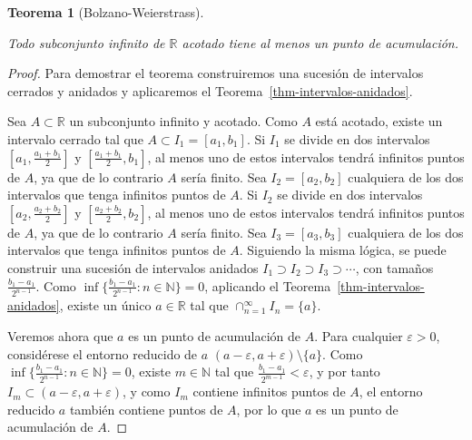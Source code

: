\documentclass[
  a4paper,
]{scrreport}
\theoremstyle{definition}
\theoremstyle{plain}
\theoremstyle{definition}
\theoremstyle{definition}
\theoremstyle{plain}
\newtheorem{theorem}{Teorema}[chapter]
\theoremstyle{plain}
\theoremstyle{remark}
\begin{document}
\begin{theorem}[Bolzano-Weierstrass]\protect\hypertarget{thm-bolzano-weierstrass}{}\label{thm-bolzano-weierstrass}

Todo subconjunto infinito de \(\mathbb{R}\) acotado tiene al menos un
punto de acumulación.

\end{theorem}

\begin{tcolorbox}[enhanced jigsaw, leftrule=.75mm, colbacktitle=quarto-callout-note-color!10!white, toprule=.15mm, opacityback=0, opacitybacktitle=0.6, toptitle=1mm, breakable, bottomtitle=1mm, colframe=quarto-callout-note-color-frame, rightrule=.15mm, titlerule=0mm, title=\textcolor{quarto-callout-note-color}{\faInfo}\hspace{0.5em}{Demostración}, arc=.35mm, left=2mm, bottomrule=.15mm, colback=white, coltitle=black]

\begin{proof}
Para demostrar el teorema construiremos una sucesión de intervalos
cerrados y anidados y aplicaremos el
Teorema~\ref{thm-intervalos-anidados}.

Sea \(A\subset \mathbb{R}\) un subconjunto infinito y acotado. Como
\(A\) está acotado, existe un intervalo cerrado tal que
\(A\subset I_1=[a_1,b_1]\). Si \(I_1\) se divide en dos intervalos
\([a_1, \frac{a_1+b_1}{2}]\) y \([\frac{a_1+b_1}{2}, b_1]\), al menos
uno de estos intervalos tendrá infinitos puntos de \(A\), ya que de lo
contrario \(A\) sería finito. Sea \(I_2=[a_2,b_2]\) cualquiera de los
dos intervalos que tenga infinitos puntos de \(A\). Si \(I_2\) se divide
en dos intervalos \([a_2, \frac{a_2+b_2}{2}]\) y
\([\frac{a_2+b_2}{2}, b_2]\), al menos uno de estos intervalos tendrá
infinitos puntos de \(A\), ya que de lo contrario \(A\) sería finito.
Sea \(I_3=[a_3,b_3]\) cualquiera de los dos intervalos que tenga
infinitos puntos de \(A\). Siguiendo la misma lógica, se puede construir
una sucesión de intervalos anidados
\(I_1\supset I_2\supset I_3 \supset \cdots\), con tamaños
\(\frac{b_1-a_1}{2^{n-1}}\). Como
\(\inf\{\frac{b_1-a_1}{2^{n-1}}: n\in\mathbb{N}\} =0\), aplicando el
Teorema~\ref{thm-intervalos-anidados}, existe un único
\(a\in\mathbb{R}\) tal que \(\cap_{n=1}^\infty I_n=\{a\}\).

Veremos ahora que \(a\) es un punto de acumulación de \(A\). Para
cualquier \(\varepsilon>0\), considérese el entorno reducido de \(a\)
\((a-\varepsilon, a+\varepsilon)\setminus\{a\}\). Como
\(\inf\{\frac{b_1-a_1}{2^{n-1}}: n\in\mathbb{N}\} =0\), existe
\(m\in\mathbb{N}\) tal que \(\frac{b_1-a_1}{2^{m-1}}<\varepsilon\), y
por tanto \(I_m\subset (a-\varepsilon, a+\varepsilon)\), y como \(I_m\)
contiene infinitos puntos de \(A\), el entorno reducido \(a\) también
contiene puntos de \(A\), por lo que \(a\) es un punto de acumulación de
\(A\).
\end{proof}

\end{tcolorbox}
\end{document}
